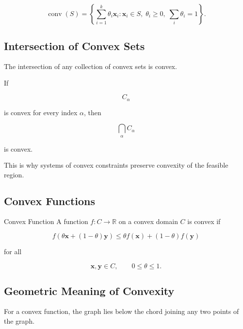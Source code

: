 \[
\boxed{
\operatorname{conv}(S)
=
\left\{
\sum_{i=1}^{k}
\theta_i\mathbf{x}_i:
\mathbf{x}_i\in S,
\;
\theta_i\geq0,
\;
\sum_i\theta_i=1
\right\}.
}
\]

\subsection{Intersection of Convex Sets}
\label{subsec:intersection-convex-sets}

The intersection of any collection of convex sets is convex.

If

\[
C_\alpha
\]

is convex for every index \(\alpha\), then

\[
\boxed{
\bigcap_\alpha C_\alpha
}
\]

is convex.

This is why systems of convex constraints preserve convexity of the
feasible region.

\subsection{Convex Functions}
\label{subsec:convex-functions-convex-optimization}

\begin{definitionbox}{Convex Function}
A function \(f:C\to\mathbb{R}\) on a convex domain \(C\) is convex if

\[
\boxed{
f
\left(
\theta\mathbf{x}
+
(1-\theta)\mathbf{y}
\right)
\leq
\theta f(\mathbf{x})
+
(1-\theta)f(\mathbf{y})
}
\]

for all

\[
\mathbf{x},\mathbf{y}\in C,
\qquad
0\leq\theta\leq1.
\]
\end{definitionbox}

\subsection{Geometric Meaning of Convexity}
\label{subsec:geometric-meaning-convexity}

For a convex function, the graph lies below the chord joining any two
points of the graph.

